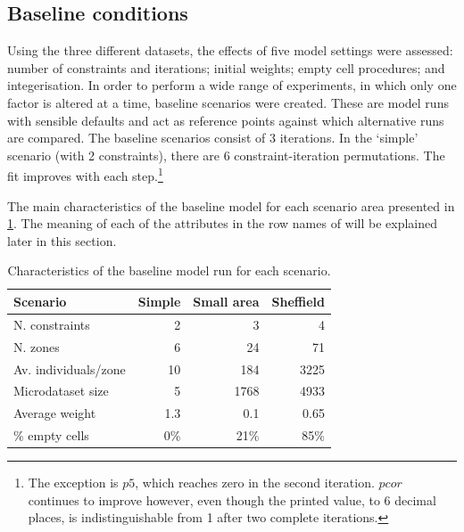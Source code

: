 \documentclass[a4paper,10pt]{article}
\begin{document}
\subsection{Baseline conditions} \label{smbase}
Using the three different datasets, the effects of five model settings were
assessed: number of constraints and iterations; initial weights; empty cell
procedures; and integerisation. In order to perform a wide range of
experiments, in which only one factor is altered at a time, 
baseline scenarios were created. These are model runs with sensible 
defaults and act as reference points against which alternative runs are compared.
The baseline scenarios consist of 3 iterations. In the `simple' scenario (with 2 constraints), 
there are 6 constraint-iteration permutations.
The
fit improves with each step.\footnote{The exception is $p5$,
which reaches zero in the second iteration. $pcor$ continues to improve however, 
even though the printed value, to 6 decimal places, is
indistinguishable from 1 after two complete iterations.}

The main characteristics of the baseline model for each scenario area
presented in \cref{tbase}. The meaning of each of the attributes in the
row names of will be explained later in this section.

\begin{table}[htbp]
\caption{Characteristics of the baseline model run for each scenario.}
\begin{center}
\begin{tabular}{lrrr}
\toprule
Scenario & \multicolumn{1}{l}{Simple} & \multicolumn{1}{l}{Small area} & \multicolumn{1}{l}{Sheffield} \\
\midrule
N. constraints & 2 & 3 & 4 \\
N. zones & 6 & 24 & 71 \\
Av. individuals/zone & 10 & 184 & 3225 \\
Microdataset size & 5 & 1768 & 4933 \\
Average weight & 1.3 & 0.1 & 0.65 \\
\% empty cells & 0\% & 21\% & 85\% \\
\bottomrule
\end{tabular}
\label{tbase}
\end{center}
\end{table}


\end{document}
